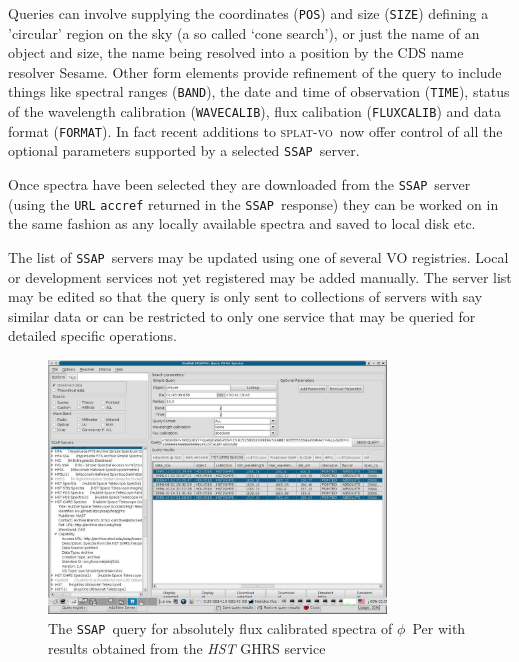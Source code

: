 \documentclass[final,authoryear,5p,times,twocolumn]{elsarticle}
\newcommand{\ssap}{\texttt{SSAP}}
\newcommand{\splatvo}{\textsc{splat-vo}}
\begin{document}
Queries can involve supplying the coordinates (\texttt{POS}) and size
(\texttt{SIZE}) defining a 'circular' region on the sky (a so called `cone
search'), or just the name of an object and size, the name being resolved into
a position by the CDS name resolver Sesame. Other form elements provide
refinement of the query to include things like spectral ranges
(\texttt{BAND}), the date and time of observation (\texttt{TIME}), status of
the wavelength calibration (\texttt{WAVECALIB}), flux calibation
(\texttt{FLUXCALIB}) and data format (\texttt{FORMAT}).  In fact recent
additions to \splatvo\ now offer control of all the optional parameters
supported by a selected \ssap\ server.

Once spectra have been selected they are downloaded from the \ssap\ server
(using the \texttt{URL} \texttt{accref} returned in the \ssap\ response) they
can be worked on in the same fashion as any locally available spectra and
saved to local disk etc.

The list of \ssap\ servers may be updated using one of several VO registries.
Local or development services not yet registered may be added manually. The
server list may be edited so that the query is only sent to collections of
servers with say similar data or can be restricted to only one service that
may be queried for detailed specific operations.

\begin{figure}[Ht]
\begin{center}
\includegraphics[width=0.8\textwidth]{hst_query.pdf}
\caption{The \ssap\ query for absolutely flux calibrated spectra of $\phi$~Per
  with results obtained from the \emph{HST} GHRS service} 
\label{fig:hst_query}
\end{center}
\end{figure}
\end{document}
